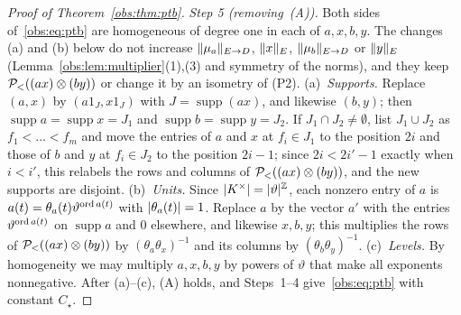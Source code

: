 \begin{proof}[Proof of Theorem~\ref{obs:thm:ptb}]
\emph{Step 5 (removing~(A)).} Both sides of~\eqref{obs:eq:ptb} are homogeneous of degree one in each of $a,x,b,y$. The
changes (a) and (b) below do not increase $\lVert \mu_a\rVert_{E\to D}$, $\lVert x\rVert_E$, $\lVert \mu_b\rVert_{E\to D}$ or $\lVert y\rVert_E$
(Lemma~\ref{obs:lem:multiplier}(1),(3) and symmetry of the norms), and they keep $\mathcal P_<((ax)\otimes(by))$ or change it by an
isometry of (P2).
(a)~\emph{Supports.} Replace $(a,x)$ by $(a1_J,x1_J)$ with $J=\operatorname{supp}(ax)$, and likewise $(b,y)$; then
$\operatorname{supp}a=\operatorname{supp}x=J_1$ and $\operatorname{supp}b=\operatorname{supp}y=J_2$. If
$J_1\cap J_2\ne\emptyset$, list $J_1\cup J_2$ as $f_1<\dots<f_m$ and move the entries of $a$ and $x$ at $f_i\in J_1$ to
the position $2i$ and those of $b$ and $y$ at $f_i\in J_2$ to the position $2i-1$; since $2i<2i'-1$ exactly when
$i<i'$, this relabels the rows and columns of $\mathcal P_<((ax)\otimes(by))$, and the new supports are disjoint.
(b)~\emph{Units.} Since $\lvert K^\times\rvert=\lvert \vartheta\rvert^\mathbb Z$, each nonzero entry of $a$ is
$a(t)=\theta_a(t)\vartheta^{\operatorname{ord} a(t)}$ with $\lvert \theta_a(t)\rvert=1$. Replace $a$ by the vector $a'$ with the entries
$\vartheta^{\operatorname{ord} a(t)}$ on $\operatorname{supp}a$ and $0$ elsewhere, and likewise $x,b,y$; this multiplies the rows of
$\mathcal P_<((ax)\otimes(by))$ by $(\theta_a\theta_x)^{-1}$ and its columns by $(\theta_b\theta_y)^{-1}$.
(c)~\emph{Levels.} By homogeneity we may multiply $a,x,b,y$ by powers of $\vartheta$ that make all exponents
nonnegative.
After (a)--(c), (A) holds, and Steps~1--4 give~\eqref{obs:eq:ptb} with constant $C_\star$.
\end{proof}

